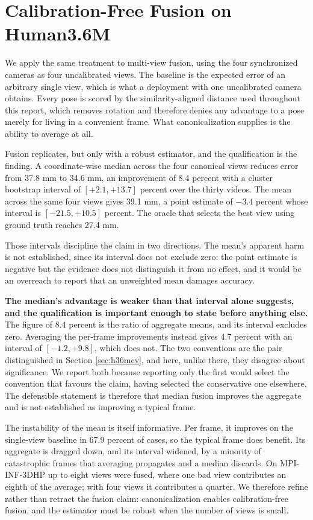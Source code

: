 \section{Calibration-Free Fusion on Human3.6M}
\label{sec:h36mfuse}

We apply the same treatment to multi-view fusion, using the four synchronized cameras as four uncalibrated views. The baseline is the expected error of an arbitrary single view, which is what a deployment with one uncalibrated camera obtains. Every pose is scored by the similarity-aligned distance used throughout this report, which removes rotation and therefore denies any advantage to a pose merely for living in a convenient frame. What canonicalization supplies is the ability to average at all.

Fusion replicates, but only with a robust estimator, and the qualification is the finding. A coordinate-wise median across the four canonical views reduces error from 37.8 mm to 34.6 mm, an improvement of 8.4 percent with a cluster bootstrap interval of $[+2.1, +13.7]$ percent over the thirty videos. The mean across the same four views gives 39.1 mm, a point estimate of $-3.4$ percent whose interval is $[-21.5, +10.5]$ percent. The oracle that selects the best view using ground truth reaches 27.4 mm.

Those intervals discipline the claim in two directions. The mean's apparent harm is not established, since its interval does not exclude zero: the point estimate is negative but the evidence does not distinguish it from no effect, and it would be an overreach to report that an unweighted mean damages accuracy.

\textbf{The median's advantage is weaker than that interval alone suggests, and the qualification is important enough to state before anything else.} The figure of 8.4 percent is the ratio of aggregate means, and its interval excludes zero. Averaging the per-frame improvements instead gives 4.7 percent with an interval of $[-1.2, +9.8]$, which does not. The two conventions are the pair distinguished in Section \ref{sec:h36mcv}, and here, unlike there, they disagree about significance. We report both because reporting only the first would select the convention that favours the claim, having selected the conservative one elsewhere. The defensible statement is therefore that median fusion improves the aggregate and is not established as improving a typical frame.

The instability of the mean is itself informative. Per frame, it improves on the single-view baseline in 67.9 percent of cases, so the typical frame does benefit. Its aggregate is dragged down, and its interval widened, by a minority of catastrophic frames that averaging propagates and a median discards. On MPI-INF-3DHP up to eight views were fused, where one bad view contributes an eighth of the average; with four views it contributes a quarter. We therefore refine rather than retract the fusion claim: canonicalization enables calibration-free fusion, and the estimator must be robust when the number of views is small.

